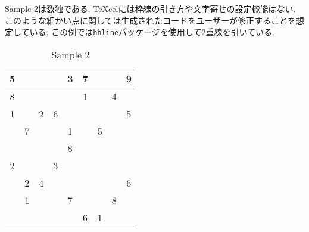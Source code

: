 \documentclass{jsarticle}
\begin{document}
Sample 2は数独である.
TeXcelには枠線の引き方や文字寄せの設定機能はない.
このような細かい点に関しては生成されたコードをユーザーが修正することを想定している.
この例では\verb|hhline|パッケージを使用して2重線を引いている.
\vspace{-0.5em}
\begin{table}[htb]
	\captionsetup{labelformat=empty,labelsep=none}
	\caption{Sample 2}
	\label{sample2}
	\centering
	\begin{tabular}{|c|c|c||c|c|c||c|c|c|}\hline
		5	&	&	&	&3	&7	&	&	&9	\\ \hline
		8	&	&	&	&	&1	&	&4	&	\\ \hline
		1	&	&2	&6	&	&	&	&	&5	\\ \hhline{|=|=|=#=|=|=#=|=|=|}
			&7	&	&	&1	&	&5	&	&	\\ \hline
			&	&	&	&8	&	&	&	&	\\ \hline
		2	&	&	&3	&	&	&	&	&	\\ \hhline{|=|=|=#=|=|=#=|=|=|}
			&2	&4	&	&	&	&	&	&6	\\ \hline
			&1	&	&	&7	&	&	&8	&	\\ \hline
			&	&	&	&	&6	&1	&	&	\\ \hline
	\end{tabular}
\end{table}
\end{document}
